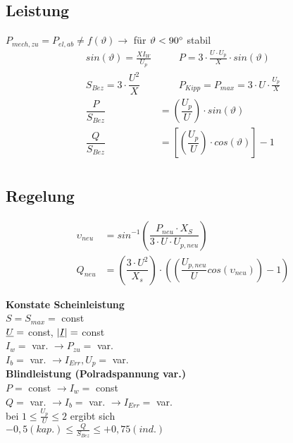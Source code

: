 \subsection{Leistung}
$P_{mech,zu} = P_{el,ab} \neq f(\vartheta) \rightarrow$ für $\vartheta < 90\degree$ stabil\\
\begin{align*}
    sin(\vartheta) = \frac{XI_W}{U_p} & \qquad P = 3 \cdot \frac{U\cdot U_p}{X} \cdot sin(\vartheta)\\
    S_{Bez} = 3 \cdot \dfrac{U^2}{X} & \qquad P_{Kipp} = P_{max} = 3\cdot U \cdot \frac{U_p}{X}\\
    \dfrac{P}{S_{Bez}} &= \left(\dfrac{U_p}{U}\right) \cdot sin(\vartheta)\\
    \dfrac{Q}{S_{Bez}} &= \left[\left(\dfrac{U_p}{U}\right) \cdot cos(\vartheta)\right] -1\\
\end{align*}


\subsection{Regelung}

\begin{align*}
    \upsilon_{neu} &= sin^{-1}\left( \dfrac{P_{neu} \cdot X_S}{3 \cdot U \cdot U_{p,neu}}\right)\\
    Q_{neu} &= \left( \dfrac{3 \cdot U^2}{X_s}\right) \cdot \left( \left( \dfrac{U_{p,neu}}{U} cos( \upsilon_{neu})\right)-1\right)
\end{align*}

\textbf{Konstate Scheinleistung}\\
\indent $S = S_{max} =$ const\\
\indent $\underline{U}=$ const, $|\underline{I}| =$ const\\
\indent $I_w =$ var. $\rightarrow P_{zu}=$ var.\\
\indent $I_b =$ var. $\rightarrow I_{Err}, U_p =$ var.\\

\textbf{Blindleistung (Polradspannung var.)}\\
\indent $P =$ const $\rightarrow I_w= $ const\\
\indent $Q =$ var. $\rightarrow I_b = $ var. $\rightarrow I_{Err}=$ var.\\
\indent bei $1 \leq \frac{U_p}{U} \leq 2$ ergibt sich \\
\indent $-0,5 (kap.) \leq \frac{Q}{S_{Bez}} \leq +0,75(ind.)$\\


